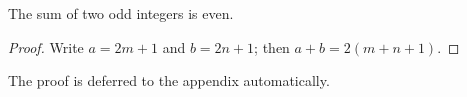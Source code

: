 \documentclass{article}
\begin{document}
\begin{thm}
The sum of two odd integers is even.
\end{thm}
\begin{proof}
Write $a=2m+1$ and $b=2n+1$; then $a+b=2(m+n+1)$.
\end{proof}
The proof is deferred to the appendix automatically.
\end{document}
